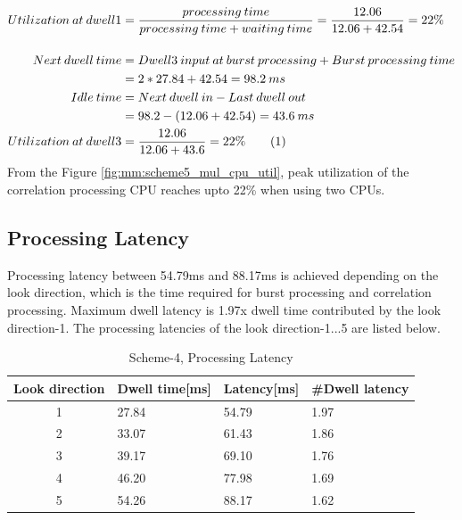 \begin{align*}
	Utilization \: at \: dwell1 &= \frac{processing \: time}{processing \: time + waiting \: time } = \frac{12.06}{12.06 + 42.54} = 22\% \\[0.4cm]
	Next \: dwell \: time &= Dwell3 \: input \: at \: burst \: processing + Burst \: processing \: time \\
	&= 2 * 27.84 + 42.54 = 98.2 \: ms\\
	Idle \: time &= Next \: dwell \: in - Last \: dwell \: out \\
	&= 98.2 - (12.06 + 42.54) = 43.6 \: ms \\
	Utilization \: at \: dwell3 &=  \frac{12.06}{12.06 + 43.6} = 22\%  \stepcounter{equation}\tag{\theequation}
\end{align*}
From the Figure \ref{fig:mm:scheme5_mul_cpu_util}, peak utilization of the correlation processing CPU reaches upto 22\% when using two CPUs. 

\subsection{Processing Latency}
\label{ss:mm:scheme5:latency}
Processing latency between 54.79ms and 88.17ms is achieved depending on the look direction, which is the time required for burst processing and correlation processing. Maximum dwell latency is 1.97x dwell time contributed by the look direction-1. The processing latencies of the look direction-1...5 are listed below. 

\begin{table}[h!]
	\centering
	\begin{tabular}{|c|l|l|l|} 
	 \hline
	 \textbf{Look direction} & \textbf{Dwell time[ms]} & \textbf{Latency[ms]} & \textbf{\#Dwell latency} \\
	 \hline
	 1 & 27.84 & 54.79 & 1.97 \\ \hline
	 2 & 33.07 & 61.43 & 1.86 \\ \hline
	 3 & 39.17 & 69.10 & 1.76 \\ \hline
	 4 & 46.20 & 77.98 & 1.69 \\ \hline
	 5 & 54.26 & 88.17 & 1.62 \\ \hline
	\end{tabular}
	\caption{Scheme-4, Processing Latency}
	\label{tbl:mm:scheme5_latency}
\end{table}

